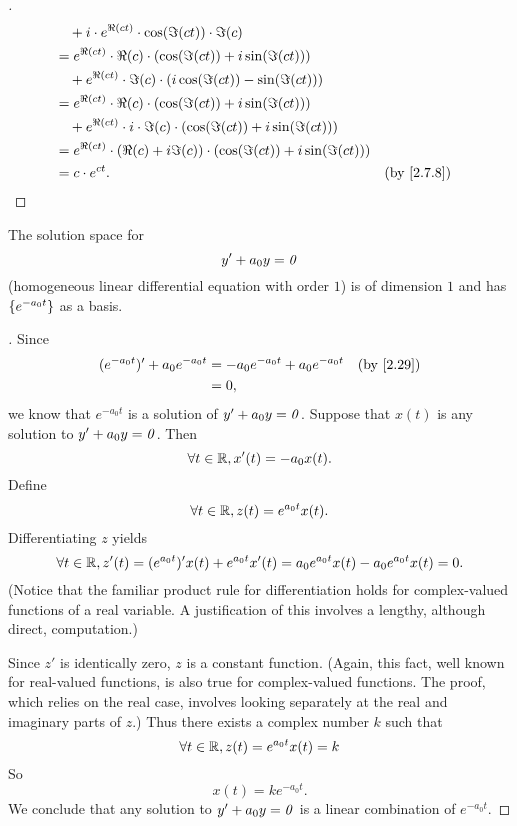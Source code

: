 \begin{proof}[]
\begin{align*}
          & \quad + i \cdot e^{\Re(ct)} \cdot \cos(\Im(ct)) \cdot \Im(c)                                                \\
          & = e^{\Re(ct)} \cdot \Re(c) \cdot (\cos(\Im(ct)) + i \sin(\Im(ct)))                                          \\
          & \quad + e^{\Re(ct)} \cdot \Im(c) \cdot (i \cos(\Im(ct)) - \sin(\Im(ct)))                                    \\
          & = e^{\Re(ct)} \cdot \Re(c) \cdot (\cos(\Im(ct)) + i \sin(\Im(ct)))                                          \\
          & \quad + e^{\Re(ct)} \cdot i \cdot \Im(c) \cdot (\cos(\Im(ct)) + i \sin(\Im(ct)))                            \\
          & = e^{\Re(ct)} \cdot (\Re(c) + i \Im(c)) \cdot (\cos(\Im(ct)) + i \sin(\Im(ct)))                             \\
          & = c \cdot e^{ct}.                                                                 &  & \by{2.7.8}
  \end{align*}
\end{proof}

\begin{thm}\label{2.30}
  The solution space for
  \[
    y' + a_0 y = \mathit{0}
  \]
  (homogeneous linear differential equation with order \(1\)) is of dimension \(1\) and has \(\left\lbrace e^{-a_0 t}\right\rbrace\) as a basis.
\end{thm}

\begin{proof}[]
  Since
  \begin{align*}
    (e^{-a_0 t})' + a_0 e^{-a_0 t} & = -a_0 e^{-a_0 t} + a_0 e^{-a_0 t} &  & \by{2.29} \\
                                   & = 0,
  \end{align*}
  we know that \(e^{-a_0 t}\) is a solution of \(y' + a_0 y = \mathit{0}\).
  Suppose that \(x(t)\) is any solution to \(y' + a_0 y = \mathit{0}\).
  Then
  \[
    \forall t \in \mathbb{R}, x'(t) = -a_0 x(t).
  \]
  Define
  \[
    \forall t \in \mathbb{R}, z(t) = e^{a_0 t} x(t).
  \]
  Differentiating \(z\) yields
  \[
    \forall t \in \mathbb{R}, z'(t) = (e^{a_0 t})' x(t) + e^{a_0 t} x'(t) = a_0 e^{a_0 t} x(t) - a_0 e^{a_0 t} x(t) = 0.
  \]
  (Notice that the familiar product rule for differentiation holds for complex-valued functions of a real variable.
  A justification of this involves a lengthy, although direct, computation.)

  Since \(z'\) is identically zero, \(z\) is a constant function.
  (Again, this fact, well known for real-valued functions, is also true for complex-valued functions.
  The proof, which relies on the real case, involves looking separately at the real and imaginary parts of \(z\).)
  Thus there exists a complex number \(k\) such that
  \[
    \forall t \in \mathbb{R}, z(t) = e^{a_0 t} x(t) = k
  \]
  So
  \[
    x(t) = k e^{-a_0 t}.
  \]
  We conclude that any solution to \(y' + a_0 y = \mathit{0}\) is a linear combination of \(e^{-a_0 t}\).
\end{proof}

